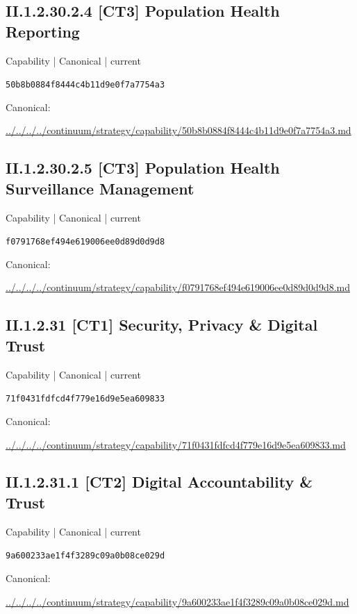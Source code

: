 \documentclass[10pt,a4paper]{article}
\begin{document}
\subsection*{II.1.2.30.2.4 [CT3] Population Health Reporting}
{\small Capability | Canonical | current}\par
\texttt{50b8b0884f8444c4b11d9e0f7a7754a3}\par
Canonical: \par
{\footnotesize\url{../../../../continuum/strategy/capability/50b8b0884f8444c4b11d9e0f7a7754a3.md}}\par
\subsection*{II.1.2.30.2.5 [CT3] Population Health Surveillance Management}
{\small Capability | Canonical | current}\par
\texttt{f0791768ef494e619006ee0d89d0d9d8}\par
Canonical: \par
{\footnotesize\url{../../../../continuum/strategy/capability/f0791768ef494e619006ee0d89d0d9d8.md}}\par
\subsection*{II.1.2.31 [CT1] Security, Privacy \& Digital Trust}
{\small Capability | Canonical | current}\par
\texttt{71f0431fdfcd4f779e16d9e5ea609833}\par
Canonical: \par
{\footnotesize\url{../../../../continuum/strategy/capability/71f0431fdfcd4f779e16d9e5ea609833.md}}\par
\subsection*{II.1.2.31.1 [CT2] Digital Accountability \& Trust}
{\small Capability | Canonical | current}\par
\texttt{9a600233ae1f4f3289c09a0b08ce029d}\par
Canonical: \par
{\footnotesize\url{../../../../continuum/strategy/capability/9a600233ae1f4f3289c09a0b08ce029d.md}}\par
\end{document}
